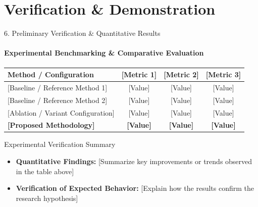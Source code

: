 \documentclass[aspectratio=169, 11pt]{beamer}
\begin{document}
\section{Verification \& Demonstration}

\begin{frame}{6. Preliminary Verification \& Quantitative Results}
    \framesubtitle{Experimental Benchmarking \& Comparative Evaluation}
    \begin{table}
        \centering
        \footnotesize
        \renewcommand{\arraystretch}{1.25}
        \begin{tabular}{p{4.5cm} c c c}
            \toprule
            \textbf{Method / Configuration} & \textbf{[Metric 1]} & \textbf{[Metric 2]} & \textbf{[Metric 3]} \\
            \midrule
            {[Baseline / Reference Method 1]} & {[Value]} & {[Value]} & {[Value]} \\
            {[Baseline / Reference Method 2]} & {[Value]} & {[Value]} & {[Value]} \\
            {[Ablation / Variant Configuration]} & {[Value]} & {[Value]} & {[Value]} \\
            \textbf{[Proposed Methodology]} & \textbf{[Value]} & \textbf{[Value]} & \textbf{[Value]} \\
            \bottomrule
        \end{tabular}
    \end{table}

    \begin{block}{Experimental Verification Summary}
        \footnotesize
        \begin{itemize}
            \item \textbf{Quantitative Findings:} {[Summarize key improvements or trends observed in the table above]}
            \item \textbf{Verification of Expected Behavior:} {[Explain how the results confirm the research hypothesis]}
        \end{itemize}
    \end{block}
\end{frame}
\end{document}

